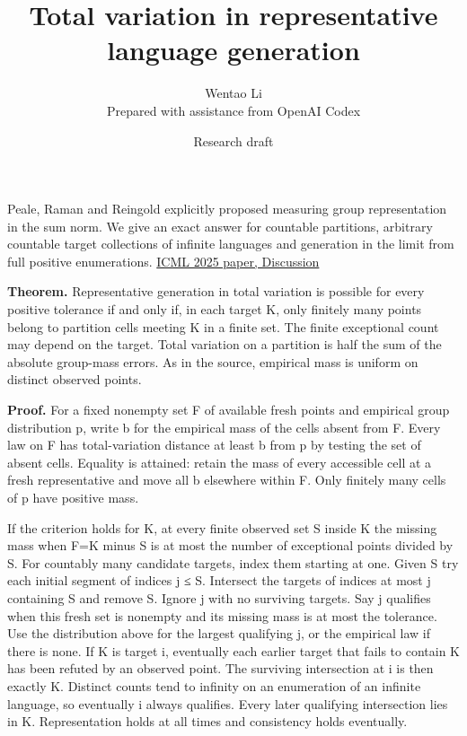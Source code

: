\documentclass[11pt]{article}
\title{Total variation in representative language generation}
\author{Wentao Li\\{\small Prepared with assistance from OpenAI Codex}}
\date{Research draft}
\begin{document}
\maketitle
Peale, Raman and Reingold explicitly proposed measuring group representation in the sum norm. We give an exact answer for countable partitions, arbitrary countable target collections of infinite languages and generation in the limit from full positive enumerations. \href{https://proceedings.mlr.press/v267/peale25a.html}{ICML 2025 paper, Discussion}

\textbf{Theorem.} Representative generation in total variation is possible for every positive tolerance if and only if, in each target K, only finitely many points belong to partition cells meeting K in a finite set. The finite exceptional count may depend on the target. Total variation on a partition is half the sum of the absolute group-mass errors. As in the source, empirical mass is uniform on distinct observed points.

\textbf{Proof.} For a fixed nonempty set F of available fresh points and empirical group distribution p, write b for the empirical mass of the cells absent from F. Every law on F has total-variation distance at least b from p by testing the set of absent cells. Equality is attained: retain the mass of every accessible cell at a fresh representative and move all b elsewhere within F. Only finitely many cells of p have positive mass.

If the criterion holds for K, at every finite observed set S inside K the missing mass when F=K minus S is at most the number of exceptional points divided by \textbar S\textbar. For countably many candidate targets, index them starting at one. Given S try each initial segment of indices j ≤ \textbar S\textbar. Intersect the targets of indices at most j containing S and remove S. Ignore j with no surviving targets. Say j qualifies when this fresh set is nonempty and its missing mass is at most the tolerance. Use the distribution above for the largest qualifying j, or the empirical law if there is none. If K is target i, eventually each earlier target that fails to contain K has been refuted by an observed point. The surviving intersection at i is then exactly K. Distinct counts tend to infinity on an enumeration of an infinite language, so eventually i always qualifies. Every later qualifying intersection lies in K. Representation holds at all times and consistency holds eventually.
\end{document}
